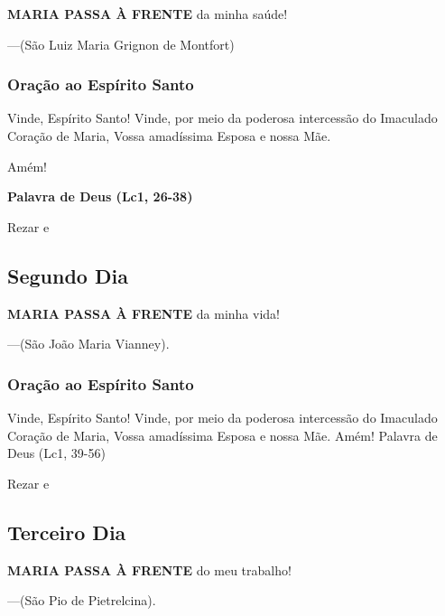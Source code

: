 \documentclass[a4paper,14pt]{extarticle} \usepackage[utf8]{inputenc}
\begin{document}
\noindent

\textbf{MARIA PASSA À FRENTE} da minha saúde!


---(São Luiz Maria Grignon de Montfort)

\subsubsection*{Oração ao Espírito Santo}

Vinde, Espírito Santo! Vinde, por meio da poderosa intercessão do Imaculado Coração de Maria, Vossa amadíssima Esposa e nossa Mãe.

Amém!

\textbf{Palavra de Deus (Lc1, 26-38)}

Rezar \textbf{} e \textbf{}


\subsection{Segundo Dia}

\noindent

\textbf{MARIA PASSA À FRENTE} da minha vida!


---(São João Maria Vianney).

\subsubsection*{Oração ao Espírito Santo}
Vinde, Espírito Santo! Vinde, por meio da poderosa intercessão do
Imaculado Coração de Maria, Vossa amadíssima Esposa e nossa Mãe.
Amém!
Palavra de Deus (Lc1, 39-56)

Rezar \textbf{} e \textbf{}

\subsection{Terceiro Dia}

\noindent

\textbf{MARIA PASSA À FRENTE} do meu trabalho!


---(São Pio de Pietrelcina).
\end{document}
